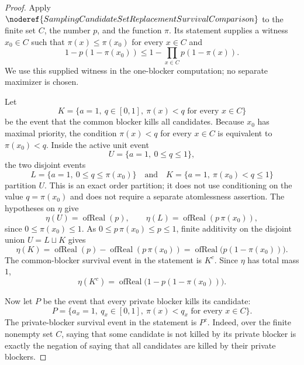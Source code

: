 \begin{proof}
Apply
\(\noderef{SamplingCandidateSetReplacementSurvivalComparison}\) to the finite
set \(C\), the number \(p\), and the function \(\pi\).  Its statement supplies
a witness \(x_0\in C\) such that \(\pi(x)\le \pi(x_0)\) for every \(x\in C\)
and
\[
1-p(1-\pi(x_0))
\le
1-\prod_{x\in C}p(1-\pi(x)).
\tag{1}
\]
We use this supplied witness in the one-blocker computation; no separate
maximizer is chosen.

Let
\[
K=\{a=1,\ q\in[0,1],\ \pi(x)<q\text{ for every }x\in C\}
\]
be the event that the common blocker kills all candidates.  Because \(x_0\)
has maximal priority, the condition \(\pi(x)<q\) for every \(x\in C\) is
equivalent to \(\pi(x_0)<q\).  Inside the active unit event
\[
U=\{a=1,\ 0\le q\le1\},
\]
the two disjoint events
\[
L=\{a=1,\ 0\le q\le\pi(x_0)\}
\quad\text{and}\quad
K=\{a=1,\ \pi(x_0)<q\le1\}
\]
partition \(U\).  This is an exact order partition; it does not use
conditioning on the value \(q=\pi(x_0)\) and does not require a separate
atomlessness assertion.  The hypotheses on \(\eta\) give
\[
\eta(U)=\operatorname{ofReal}(p),\qquad
\eta(L)=\operatorname{ofReal}(p\,\pi(x_0)),
\]
since \(0\le\pi(x_0)\le1\).  As \(0\le p\,\pi(x_0)\le p\le1\), finite
additivity on the disjoint union \(U=L\sqcup K\) gives
\[
\eta(K)
=\operatorname{ofReal}(p)-\operatorname{ofReal}(p\,\pi(x_0))
=\operatorname{ofReal}\bigl(p(1-\pi(x_0))\bigr).
\]
The common-blocker survival event in the statement is \(K^c\).  Since
\(\eta\) has total mass \(1\),
\[
\eta(K^c)=\operatorname{ofReal}\bigl(1-p(1-\pi(x_0))\bigr).
\tag{2}
\]

Now let \(P\) be the event that every private blocker kills its candidate:
\[
P=\{a_x=1,\ q_x\in[0,1],\ \pi(x)<q_x
       \text{ for every }x\in C\}.
\]
The private-blocker survival event in the statement is \(P^c\).  Indeed, over
the finite nonempty set \(C\), saying that some candidate is not killed by its
private blocker is exactly the negation of saying that all candidates are
killed by their private blockers.


\end{proof}
